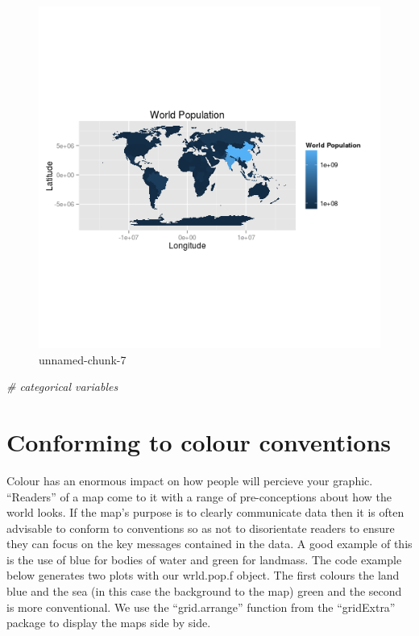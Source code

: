 \documentclass[]{article}
\makeatletter
\newenvironment{Shaded}{}{}
\newcommand{\CommentTok}[1]{\textcolor[rgb]{0.38,0.63,0.69}{\textit{{#1}}}}
\def\maxwidth{\ifdim\Gin@nat@width>\linewidth\linewidth
\else\Gin@nat@width\fi}
\let\Oldincludegraphics\includegraphics
\renewcommand{\includegraphics}[1]{\Oldincludegraphics[width=\maxwidth]{#1}}
\makeatother
\begin{document}
\begin{figure}[htbp]
\centering
\includegraphics{figure/unnamed-chunk-7.png}
\caption{unnamed-chunk-7}
\end{figure}

\begin{Shaded}
\begin{Highlighting}[]

\CommentTok{# categorical variables}
\end{Highlighting}
\end{Shaded}

\section{Conforming to colour conventions}

Colour has an enormous impact on how people will percieve your graphic.
``Readers'' of a map come to it with a range of pre-conceptions about
how the world looks. If the map's purpose is to clearly communicate data
then it is often advisable to conform to conventions so as not to
disorientate readers to ensure they can focus on the key messages
contained in the data. A good example of this is the use of blue for
bodies of water and green for landmass. The code example below generates
two plots with our wrld.pop.f object. The first colours the land blue
and the sea (in this case the background to the map) green and the
second is more conventional. We use the ``grid.arrange'' function from
the ``gridExtra'' package to display the maps side by side.
\end{document}
